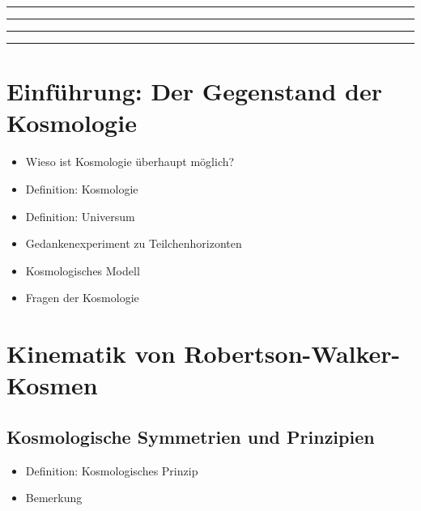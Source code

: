 \documentclass{article}
\begin{document}
  \hrule
  \smallskip
  \hrule
  \begin{multicols}{2}
    \tableofcontents
  \end{multicols}
  \hrule
  \smallskip
  \hrule
  \smallskip

  \begin{multicols}{2}

  \section{Einführung: Der Gegenstand der Kosmologie} %
  \label{sec:einführung_der_gegenstand_der_kosmologie}
    \begin{itemize}
      \item Wieso ist Kosmologie überhaupt möglich?
      \item Definition: Kosmologie
      \item Definition: Universum
      \item Gedankenexperiment zu Teilchenhorizonten
      \item Kosmologisches Modell
      \item Fragen der Kosmologie
    \end{itemize}

  \section{Kinematik von Robertson-Walker-Kosmen} %
  \label{sec:kinematik_von_robertson_walker_kosmen}
    \subsection{Kosmologische Symmetrien und Prinzipien} %
    \label{sub:kosmologische_symmetrien_und_prinzipien}
      \begin{itemize}
        \item Definition: Kosmologisches Prinzip
        \item Bemerkung
      \end{itemize}


\end{multicols}
\end{document}
